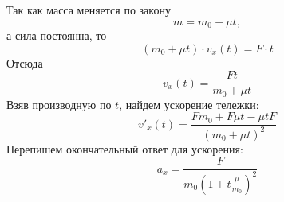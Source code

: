 \documentclass[a5paper,10pt]{article}\usepackage[usenames,dvipsnames]{color}
\begin{document}
Так как масса меняется по закону 
\begin{equation}
    m=m_0+\mu t,
\end{equation}
а сила постоянна, то
\begin{equation}
    (m_0+\mu t)\cdot v_x(t)=F\cdot t
\end{equation}
Отсюда
\begin{equation}
    v_x(t)=\frac{Ft}{m_0+\mu t} 
\end{equation}
Взяв производную по $t$, найдем ускорение тележки:
\begin{equation}
    v'_x(t)=\frac{Fm_0+F\mu t - \mu t F}{(m_0+\mu t)^2}
\end{equation}
Перепишем окончательный ответ для ускорения:
\begin{equation}
    a_x=\frac{F}{m_0(1+t\frac{\mu}{m_0})^2}
\end{equation}
\end{document}

